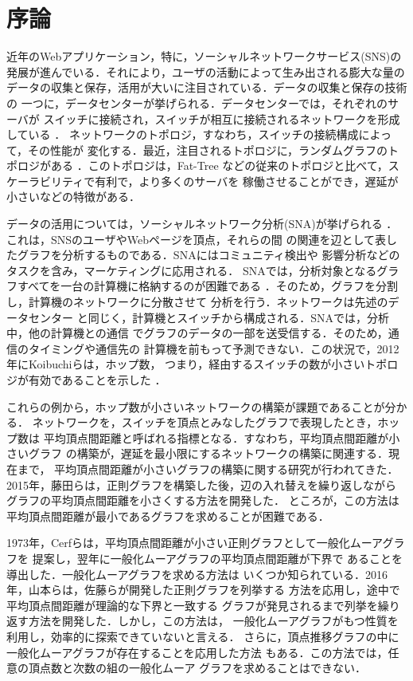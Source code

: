 
\chapter{序論}

近年のWebアプリケーション，特に，ソーシャルネットワークサービス(SNS)の
発展が進んでいる．それにより，ユーザの活動によって生み出される膨大な量の
データの収集と保存，活用が大いに注目されている．データの収集と保存の技術の
一つに，データセンターが挙げられる．データセンターでは，それぞれのサーバが
スイッチに接続され，スイッチが相互に接続されるネットワークを形成している
\cite{Greenberg2009,Al-Fares2008}．
ネットワークのトポロジ，すなわち，スイッチの接続構成によって，その性能が
変化する．最近，注目されるトポロジに，ランダムグラフのトポロジがある
\cite{Singla2011,Koibuchi2012}．このトポロジは，Fat-Tree\cite{Al-Fares2008}
などの従来のトポロジと比べて，スケーラビリティで有利で，より多くのサーバを
稼働させることができ，遅延が小さいなどの特徴がある\cite{Singla2011}．

データの活用については，ソーシャルネットワーク分析(SNA)が挙げられる
\cite{Aggarwal2011}．これは，SNSのユーザやWebページを頂点，それらの間
の関連を辺として表したグラフを分析するものである．SNAにはコミュニティ検出や
影響分析などのタスクを含み，マーケティングに応用される．
SNAでは，分析対象となるグラフすべてを一台の計算機に格納するのが困難である
\cite{Ching2015}．そのため，グラフを分割し，計算機のネットワークに分散させて
分析を行う\cite{Ching2015,Malewicz2010}．ネットワークは先述のデータセンター
と同じく，計算機とスイッチから構成される．SNAでは，分析中，他の計算機との通信
でグラフのデータの一部を送受信する．そのため，通信のタイミングや通信先の
計算機を前もって予測できない．この状況で，2012年にKoibuchiらは，ホップ数，
つまり，経由するスイッチの数が小さいトポロジが有効であることを示した
\cite{Koibuchi2012}．

これらの例から，ホップ数が小さいネットワークの構築が課題であることが分かる．
ネットワークを，スイッチを頂点とみなしたグラフで表現したとき，ホップ数は
平均頂点間距離と呼ばれる指標となる．すなわち，平均頂点間距離が小さいグラフ
の構築が，遅延を最小限にするネットワークの構築に関連する．現在まで，
平均頂点間距離が小さいグラフの構築に関する研究が行われてきた．
2015年，藤田らは，正則グラフを構築した後，辺の入れ替えを繰り返しながら
グラフの平均頂点間距離を小さくする方法を開発した\cite{Fujita2015}．
ところが，この方法は平均頂点間距離が最小であるグラフを求めることが困難である．

1973年，Cerfらは，平均頂点間距離が小さい正則グラフとして一般化ムーアグラフを
提案し\cite{Cerf1973}，翌年に一般化ムーアグラフの平均頂点間距離が下界で
あることを導出した\cite{Cerf1974Lower}．一般化ムーアグラフを求める方法は
いくつか知られている．2016年，山本らは，佐藤らが開発した正則グラフを列挙する
方法\cite{Sato2008}を応用し，途中で平均頂点間距離が理論的な下界と一致する
グラフが発見されるまで列挙を繰り返す方法を開発した．しかし，この方法は，
一般化ムーアグラフがもつ性質を利用し，効率的に探索できていないと言える．
さらに，頂点推移グラフの中に一般化ムーアグラフが存在することを応用した方法
もある\cite{Sampels2004}．この方法では，任意の頂点数と次数の組の一般化ムーア
グラフを求めることはできない．


